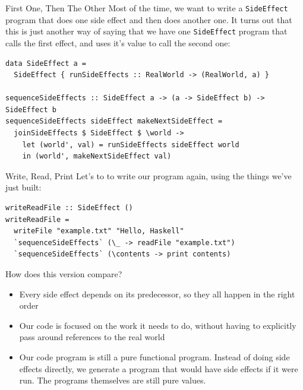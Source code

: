 \documentclass[10pt, presentation, colorlinks]{beamer}
\begin{document}
\begin{frame}[label={sec:org4894e81},fragile]{First One, Then The Other}
 Most of the time, we want to write a \texttt{SideEffect} program that does
one side effect \alert{and then} does another one. It turns out that this is
just another way of saying that we have one \texttt{SideEffect} program that
calls the first effect, and uses it's value to call the second one:

\begin{verbatim}
data SideEffect a =
  SideEffect { runSideEffects :: RealWorld -> (RealWorld, a) }

sequenceSideEffects :: SideEffect a -> (a -> SideEffect b) -> SideEffect b
sequenceSideEffects sideEffect makeNextSideEffect =
  joinSideEffects $ SideEffect $ \world ->
    let (world', val) = runSideEffects sideEffect world
    in (world', makeNextSideEffect val)
\end{verbatim}
\end{frame}

\begin{frame}[label={sec:org303299f},fragile]{Write, Read, Print}
 Let's to to write our program again, using the things we've just built:

\begin{verbatim}
writeReadFile :: SideEffect ()
writeReadFile =
  writeFile "example.txt" "Hello, Haskell"
  `sequenceSideEffects` (\_ -> readFile "example.txt")
  `sequenceSideEffects` (\contents -> print contents)
\end{verbatim}

\bigskip

How does this version compare?

\bigskip

\pause
\begin{itemize}
\item Every side effect depends on its predecessor, so they all happen in the right order
\end{itemize}
\pause
\begin{itemize}
\item Our code is focused on the work it needs to do, without having to explicitly pass around references to the real world
\end{itemize}
\pause
\begin{itemize}
\item Our code program is still a \alert{pure functional program}. Instead of doing side effects directly, we \alert{generate a program} that would have side effects if it were run. The programs themselves are still pure values.
\end{itemize}
\end{frame}
\end{document}
